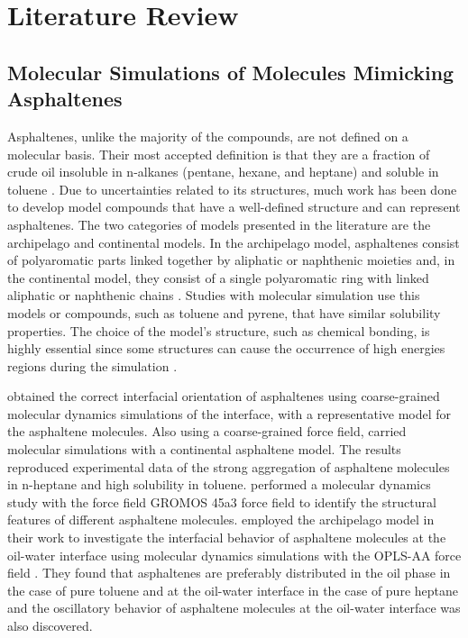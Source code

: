 
\chapter{Literature Review} %
\label{Chapter2} %
\section{Molecular Simulations of Molecules Mimicking Asphaltenes}

Asphaltenes, unlike the majority of the compounds, are not defined on a molecular basis. Their most accepted definition is that they are a fraction of crude oil insoluble in n-alkanes (pentane, hexane, and heptane) and soluble in toluene \cite{SJOBLOM2003399}. Due to uncertainties related to its structures, much work has been done to develop model compounds that have a well-defined structure and can represent asphaltenes. The two categories of models presented in the literature are the archipelago and continental models. In the archipelago model, asphaltenes consist of polyaromatic parts linked together by aliphatic or naphthenic moieties and, in the continental model, they consist of a single
polyaromatic ring with linked aliphatic or naphthenic chains \cite{doi:10.1021/ef900975e,doi:10.1080/0892702031000148762}. Studies with molecular simulation use this models or compounds, such as toluene and pyrene, that have similar solubility properties. The choice of the model's structure, such as chemical bonding, is highly essential since some structures can cause the occurrence of high energies regions during the simulation \cite{doi:10.1021/ef200507c} .   

  obtained the correct interfacial orientation of asphaltenes using coarse-grained molecular dynamics simulations of the interface, with a representative model for the asphaltene molecules. Also using a coarse-grained force field,  carried molecular simulations with a continental asphaltene model. The results reproduced experimental data of the strong aggregation
of asphaltene molecules in n-heptane and high solubility in toluene.  performed a molecular
dynamics study with the force field GROMOS 45a3 force field \cite{JCC:JCC1078} to identify the structural features of different asphaltene molecules.  employed the archipelago model in their work to investigate the interfacial behavior of asphaltene molecules at the oil-water interface using molecular dynamics simulations with the OPLS-AA force field \cite{doi:10.1021/ja00214a001}. They found that asphaltenes are preferably distributed in the oil phase in the case of pure toluene and at the oil-water interface
in the case of pure heptane and the
oscillatory behavior of asphaltene molecules at the oil-water interface was also discovered.

